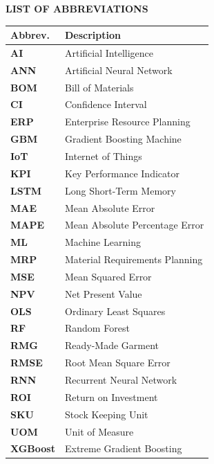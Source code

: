 \hfuzz=20pt
\begin{center}
{\large\bf LIST OF ABBREVIATIONS}
\end{center}
\vspace{0.3in}
\noindent

\begin{tabularx}{\textwidth}{@{}l X@{}}
\toprule
\textbf{Abbrev.} & \textbf{Description} \\
\midrule
\textbf{AI}  & Artificial Intelligence\\
\textbf{ANN}  & Artificial Neural Network\\
\textbf{BOM}  & Bill of Materials\\
\textbf{CI}  & Confidence Interval\\
\textbf{ERP}  & Enterprise Resource Planning\\
\textbf{GBM}  & Gradient Boosting Machine\\
\textbf{IoT}  & Internet of Things\\
\textbf{KPI}  & Key Performance Indicator\\
\textbf{LSTM}  & Long Short-Term Memory\\
\textbf{MAE}  & Mean Absolute Error\\
\textbf{MAPE}  & Mean Absolute Percentage Error\\
\textbf{ML}   & Machine Learning\\
\textbf{MRP}  & Material Requirements Planning\\
\textbf{MSE}  & Mean Squared Error\\
\textbf{NPV}  & Net Present Value\\
\textbf{OLS}  & Ordinary Least Squares\\
\textbf{RF}   & Random Forest\\
\textbf{RMG}  & Ready-Made Garment\\
\textbf{RMSE} & Root Mean Square Error\\
\textbf{RNN}  & Recurrent Neural Network\\
\textbf{ROI}  & Return on Investment\\
\textbf{SKU}  & Stock Keeping Unit\\
\textbf{UOM}  & Unit of Measure\\
\textbf{XGBoost} & Extreme Gradient Boosting\\
\bottomrule
\end{tabularx}

